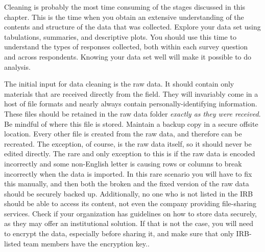 Cleaning is probably the most time consuming of the stages discussed in this chapter.
This is the time when you obtain an extensive understanding of  the contents and structure of the data that was collected.
Explore your data set using tabulations, summaries, and descriptive plots.
You should use this time to understand the types of responses collected, both within each survey question and across respondents.
Knowing your data set well will make it possible to do analysis.


The initial input for data cleaning is the raw data.
It should contain only materials that are received directly from the field.
They will invariably come in a host of file formats and nearly always contain personally-identifying information.
These files should be retained in the raw data folder \textit{exactly as they were received}.
Be mindful of where this file is stored. 
Maintain a backup copy in a secure offsite location.
Every other file is created from the raw data, and therefore can be recreated.
The exception, of course, is the raw data itself, so it should never be edited 
directly.
The rare and only exception to this is if the raw data is encoded incorrectly
and some non-English letter is causing rows or columns to break incorrectly
when the data is imported. In this rare scenario you will have to fix this 
manually, and then both the broken and the fixed version of the raw data should 
be securely backed up.
Additionally, no one who is not listed in the IRB should be able to access its content, not even the company providing file-sharing services.
Check if your organization has guidelines on how to store data securely, as they may offer an institutional solution. 
If that is not the case, you will need to encrypt the data, especially before
sharing it, and make sure that only IRB-listed team members have the
encryption key..

